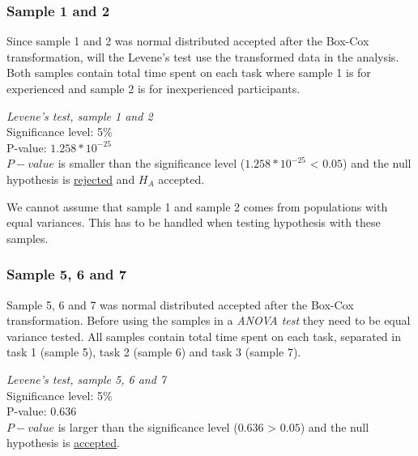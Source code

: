 \subsubsection[Sample 1 and 2]{Sample 1 and 2}\label{sec:sample1,2}
Since sample 1 and 2 was normal distributed accepted after the Box-Cox transformation, will the Levene's test use the transformed data in the analysis. Both samples contain total time spent on each task where sample 1 is for experienced and sample 2 is for inexperienced participants.

 \begin{center}
	\begin{tcolorbox}[box align=center,width=\textwidth-5cm]
		\centering
		\textit{Levene's test, sample 1 and 2}\\
		Significance level: 5\%  \\[0.5cm]
		
		P-value: $1.258 * 10^{-25}$\\[0.2cm]
		
		$P-value$ is smaller than the significance level ($1.258*10^{-25}$ < $0.05$) and the null hypothesis is \underline{rejected} and $H_A$ accepted.\\[0.5cm]
	\end{tcolorbox} 
\end{center}

We cannot assume that sample 1 and sample 2 comes from populations with equal variances. This has to be handled when testing hypothesis with these samples.

\subsubsection{Sample 5, 6 and 7}\label{sec:sample5,6,7}
Sample 5, 6 and 7 was normal distributed accepted after the Box-Cox transformation. Before using the samples in a \textit{ANOVA test} they need to be equal variance tested. All samples contain total time spent on each task, separated in task 1 (sample 5), task 2 (sample 6) and task 3 (sample 7). 

 \begin{center}
	\begin{tcolorbox}[box align=center,width=\textwidth-5cm]
		\centering
		\textit{Levene's test, sample 5, 6 and 7}\\
		Significance level: 5\%  \\[0.5cm]
		
		P-value: $0.636$\\[0.2cm]
		
		$P-value$ is larger than the significance level ($0.636$ > $0.05$) and the null hypothesis is \underline{accepted}.\\[0.5cm]
	\end{tcolorbox} 
\end{center}

